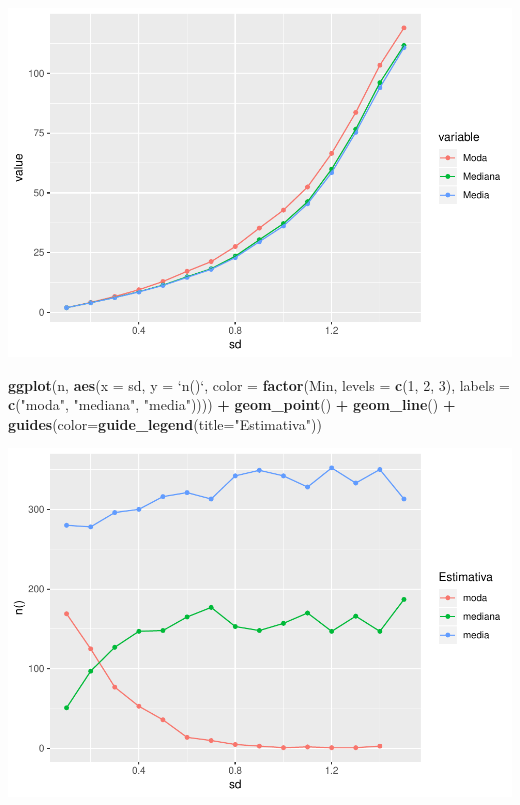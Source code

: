 \documentclass[]{article}
\newenvironment{Shaded}{\begin{snugshade}}{\end{snugshade}}
\newcommand{\KeywordTok}[1]{\textcolor[rgb]{0.13,0.29,0.53}{\textbf{#1}}}
\newcommand{\DataTypeTok}[1]{\textcolor[rgb]{0.13,0.29,0.53}{#1}}
\newcommand{\DecValTok}[1]{\textcolor[rgb]{0.00,0.00,0.81}{#1}}
\newcommand{\StringTok}[1]{\textcolor[rgb]{0.31,0.60,0.02}{#1}}
\newcommand{\OperatorTok}[1]{\textcolor[rgb]{0.81,0.36,0.00}{\textbf{#1}}}
\newcommand{\NormalTok}[1]{#1}
\begin{document}
\includegraphics{Impacto_sigma_files/figure-latex/unnamed-chunk-48-1.pdf}

\begin{Shaded}
\begin{Highlighting}[]
\KeywordTok{ggplot}\NormalTok{(n, }\KeywordTok{aes}\NormalTok{(}\DataTypeTok{x =}\NormalTok{ sd, }\DataTypeTok{y =} \StringTok{`}\DataTypeTok{n()}\StringTok{`}\NormalTok{, }
              \DataTypeTok{color =} \KeywordTok{factor}\NormalTok{(Min, }
                             \DataTypeTok{levels =} \KeywordTok{c}\NormalTok{(}\DecValTok{1}\NormalTok{, }\DecValTok{2}\NormalTok{, }\DecValTok{3}\NormalTok{), }
                             \DataTypeTok{labels =} \KeywordTok{c}\NormalTok{(}\StringTok{"moda"}\NormalTok{, }\StringTok{"mediana"}\NormalTok{, }\StringTok{"media"}\NormalTok{)))) }\OperatorTok{+}\StringTok{ }
\StringTok{  }\KeywordTok{geom_point}\NormalTok{() }\OperatorTok{+}\StringTok{ }
\StringTok{  }\KeywordTok{geom_line}\NormalTok{() }\OperatorTok{+}\StringTok{ }
\StringTok{  }\KeywordTok{guides}\NormalTok{(}\DataTypeTok{color=}\KeywordTok{guide_legend}\NormalTok{(}\DataTypeTok{title=}\StringTok{"Estimativa"}\NormalTok{))}
\end{Highlighting}
\end{Shaded}

\includegraphics{Impacto_sigma_files/figure-latex/unnamed-chunk-49-1.pdf}
\end{document}
